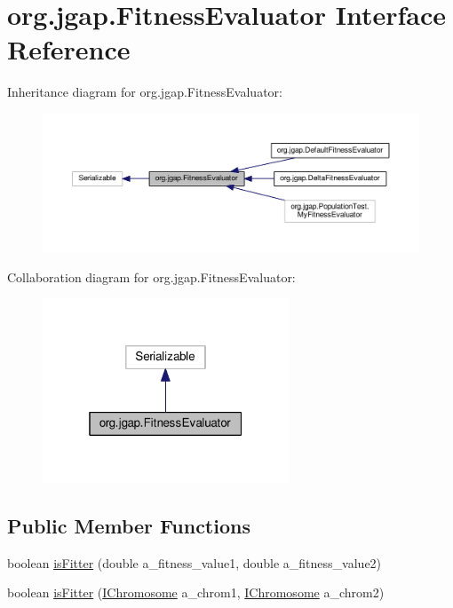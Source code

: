 \hypertarget{interfaceorg_1_1jgap_1_1_fitness_evaluator}{\section{org.\-jgap.\-Fitness\-Evaluator Interface Reference}
\label{interfaceorg_1_1jgap_1_1_fitness_evaluator}
}


Inheritance diagram for org.\-jgap.\-Fitness\-Evaluator\-:
\nopagebreak
\begin{figure}[H]
\begin{center}
\leavevmode
\includegraphics[width=350pt]{interfaceorg_1_1jgap_1_1_fitness_evaluator__inherit__graph}
\end{center}
\end{figure}


Collaboration diagram for org.\-jgap.\-Fitness\-Evaluator\-:
\nopagebreak
\begin{figure}[H]
\begin{center}
\leavevmode
\includegraphics[width=208pt]{interfaceorg_1_1jgap_1_1_fitness_evaluator__coll__graph}
\end{center}
\end{figure}
\subsection*{Public Member Functions}
\begin{DoxyCompactItemize}
\item 
boolean \hyperlink{interfaceorg_1_1jgap_1_1_fitness_evaluator_aad9309b75a437b32641480be173550eb}{is\-Fitter} (double a\-\_\-fitness\-\_\-value1, double a\-\_\-fitness\-\_\-value2)
\item 
boolean \hyperlink{interfaceorg_1_1jgap_1_1_fitness_evaluator_ad22e8b020f3975345f3f94f96de35a89}{is\-Fitter} (\hyperlink{interfaceorg_1_1jgap_1_1_i_chromosome}{I\-Chromosome} a\-\_\-chrom1, \hyperlink{interfaceorg_1_1jgap_1_1_i_chromosome}{I\-Chromosome} a\-\_\-chrom2)
\end{DoxyCompactItemize}
